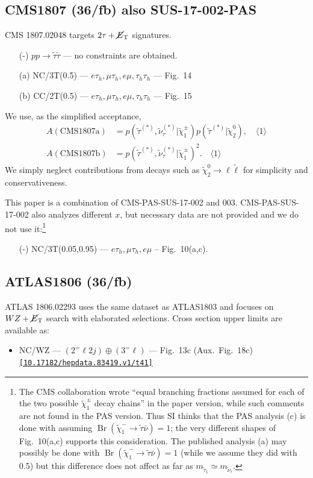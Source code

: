 \documentclass[a4paper,10pt,captions=tableheading,DIV=14]{scrartcl}
\numberwithin{equation}{section}
\newcommand\w[1]{_{\mathrm{#1}}}
\DeclareMathOperator{\Br}{\mathrm{Br}}
\newcommand\vev[1]{\langle#1\rangle}
\newcommand\doi[1]{{\footnotesize \texttt{\href{https://doi.org/#1}{[#1]}}}}
\newcommand\neut  [1][\relax]{{\tilde\chi^0_{#1}}}
\newcommand\charM [1][\relax]{{\tilde\chi^-_{#1}}}
\newcommand\charPM[1][\relax]{{\tilde\chi^\pm_{#1}}}
\newcommand\mET{\cancel{E}\w T}
\begin{document}
\subsection{CMS1807 (36/fb) also SUS-17-002-PAS}
CMS 1807.02048\cite{1807.02048} targets $2\tau+\mET$ signatures.
\begin{itemize}
 \item[(-)] $pp\to\tilde\tau\tilde\tau$ --- no constraints are obtained.
 \item[(a)] NC/3T(0.5) --- $e\tau_h, \mu\tau_h, e\mu, \tau_h\tau_h$ --- Fig.~14
 \item[(b)] CC/2T(0.5) --- $e\tau_h, \mu\tau_h, e\mu, \tau_h\tau_h$ --- Fig.~15
\end{itemize}
We use, as the simplified acceptance,
\begin{align}
 A(\text{CMS1807a}) &=
 p(\tilde\tau^{(*)},\tilde\nu_\tau^{(*)}|\charPM[1])
 p(\tilde\tau^{(*)}|\neut[2]),\quad\vev{1}\\
 A(\text{CMS1807b}) &=
 p(\tilde\tau^{(*)},\tilde\nu_\tau^{(*)}|\charPM[1])^2.\quad\vev{1}
\end{align}
We simply neglect contributions from decays such as $\neut[2]\to\ell\tilde\ell$ for simplicity and conservativeness.

This paper is a combination of CMS-PAS-SUS-17-002 and 003. CMS-PAS-SUS-17-002 also analyzes different $x$, but necessary data are not provided and we do not use it:\footnote{The CMS collaboration wrote ``equal branching fractions assumed for each of the two possible $\charPM[1]$ decay chains'' in the paper version, while such comments are not found in the PAS version. Thus SI thinks that the PAS analysis (c) is done with assuming $\Br(\charM[1]\to\tilde\tau\bar\nu)=1$; the very different shapes of Fig.~10(a,c) supports this consideration.
The published analysis (a) may possibly be done with $\Br(\charM[1]\to\tilde\tau\bar\nu)=1$ (while we assume they did with 0.5) but this difference does not affect as far as $m_{\tilde\tau_1}\simeq m_{\tilde\nu_\tau}$.}
\begin{itemize}
 \item[(-)] NC/3T(0.05,0.95) --- $e\tau_h,\mu\tau_h,e\mu$ -- Fig.~10(a,c).
\end{itemize}

\subsection{ATLAS1806 (36/fb)}
ATLAS 1806.02293\cite{1806.02293} uses the same dataset as ATLAS1803 and focuses on $WZ+\mET$ search with elaborated selections.
Cross section upper limits are available as:
\begin{itemize}
 \item NC/WZ --- $(2^=\ell2j)\oplus(3^=\ell)$ --- Fig.~13c (Aux.~Fig.~18c)
\doi{10.17182/hepdata.83419.v1/t41}
\end{itemize}
\end{document}
